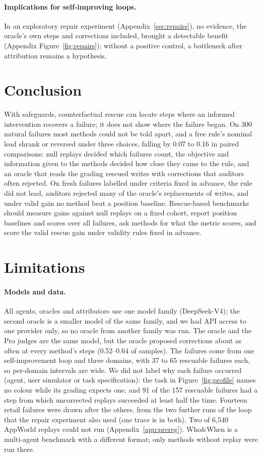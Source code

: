 \documentclass[11pt]{article}
\begin{document}
\paragraph{Implications for self-improving loops.} In an exploratory repair experiment (Appendix~\ref{sec:repairs}), no evidence, the oracle's own steps and corrections included, brought a detectable benefit (Appendix Figure~\ref{fig:repairs}); without a positive control, a bottleneck after attribution remains a hypothesis.

\section{Conclusion}

With safeguards, counterfactual rescue can locate steps where an informed intervention recovers a failure; it does not show where the failure began. On 300 natural failures most methods could not be told apart, and a free rule's nominal lead shrank or reversed under three choices, falling by 0.07 to 0.16 in paired comparisons: null replays decided which failures count, the objective and information given to the methods decided how close they came to the rule, and an oracle that reads the grading rescued writes with corrections that auditors often rejected. On fresh failures labelled under criteria fixed in advance, the rule did not lead, auditors rejected many of the oracle's replacements of writes, and under valid gain no method beat a position baseline. Rescue-based benchmarks should measure gains against null replays on a fixed cohort, report position baselines and scores over all failures, ask methods for what the metric scores, and score the valid rescue gain under validity rules fixed in advance.

\section*{Limitations}
\paragraph{Models and data.} All agents, oracles and attributors use one model family (DeepSeek-V4); the second oracle is a smaller model of the same family, and we had API access to one provider only, so no oracle from another family was run. The oracle and the Pro judges are the same model, but the oracle proposed corrections about as often at every method's steps (0.52--0.64 of samples). The failures come from one self-improvement loop and three domains, with 37 to 65 rescuable failures each, so per-domain intervals are wide. We did not label why each failure occurred (agent, user simulator or task specification): the task in Figure~\ref{fig:profile} names no colour while its grading expects one, and 91 of the 157 rescuable failures had a step from which uncorrected replays succeeded at least half the time. Fourteen retail failures were drawn after the others, from the two further runs of the loop that the repair experiment also used (one trace is in both). Two of 6{,}540 AppWorld replays could not run (Appendix~\ref{app:prereg}). Who\&When is a multi-agent benchmark with a different format; only methods without replay were run there.
\end{document}
